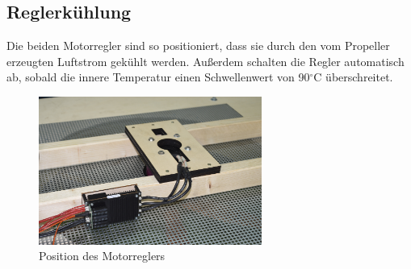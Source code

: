 \subsection{Reglerkühlung}
Die beiden Motorregler sind so positioniert, dass sie durch den vom Propeller erzeugten Luftstrom gekühlt werden. Außerdem schalten die Regler automatisch ab, sobald die innere Temperatur einen Schwellenwert von 90$^\circ$C überschreitet. 
\begin{figure}[H]
    \centering
    \includegraphics[width=0.65\textwidth]{Fotos/Gitter_unten.jpg}
    \caption{Position des Motorreglers}    
\end{figure}

